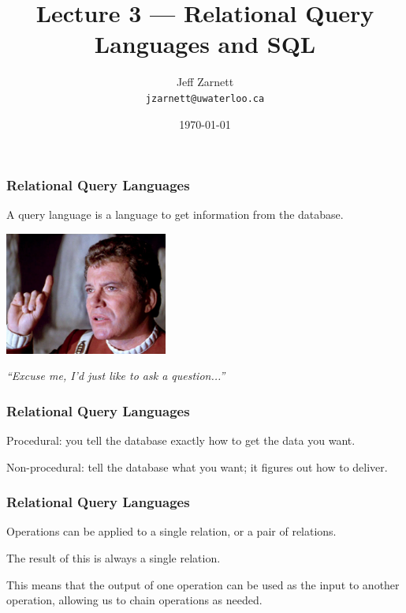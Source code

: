 

\title{Lecture 3 --- Relational Query Languages and SQL}

\author{Jeff Zarnett \\ \small \texttt{jzarnett@uwaterloo.ca}}
\date{\today}




\begin{frame}
  \titlepage

 \end{frame}



\begin{frame}
\frametitle{Relational Query Languages}

A \alert{query language} is a language to get information from the database. 

\begin{center}
	\includegraphics[width=0.4\textwidth]{images/askaquestion.jpg}
\end{center}
\hfill \textit{``Excuse me, I'd just like to ask a question...''}

 \end{frame}



\begin{frame}
\frametitle{Relational Query Languages}

Procedural: you tell the database exactly how to get the data you want.

Non-procedural: tell the database what you want; it figures out how to deliver.

\end{frame}



\begin{frame}
\frametitle{Relational Query Languages}

Operations can be applied to a single relation, or a pair of relations.

The result of this is always a single relation. 

This means that the output of one operation can be used as the input to another operation, allowing us to chain operations as needed. 

\end{frame}




